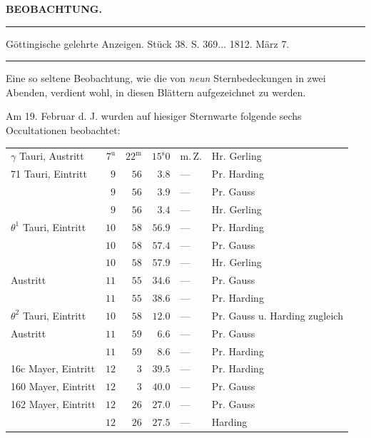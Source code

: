 \clearpage{}\hypertarget{native-353-lower}{}\label{native-353-lower}
\begin{center}\textbf{BEOBACHTUNG.}\par\vspace{4pt}\hrule\vspace{4pt}\fontsize{10}{12}\selectfont Göttingische gelehrte Anzeigen. Stück 38. S. 369\;... 1812. März 7.\par\vspace{4pt}\hrule\vspace{4pt}\end{center}

\par\indent Eine so seltene Beobachtung, wie die von \emph{neun} Sternbedeckungen in zwei Abenden, verdient wohl, in diesen Blättern aufgezeichnet zu werden.

\par\indent Am 19. Februar d. J. wurden auf hiesiger Sternwarte folgende sechs Occultationen beobachtet:

\begin{center}\fontsize{9}{11}\selectfont\setlength{\tabcolsep}{2.5pt}\renewcommand{\arraystretch}{1.15}\begin{tabular}{lrrrll}
$\gamma$ Tauri, Austritt & $7^{\mathrm u}$ & $22^{\mathrm m}$ & $15^{\mathrm s}0$ & m.\,Z. & Hr. Gerling\\
71 Tauri, Eintritt & $9$ & $56$ & $3.8$ & — & Pr. Harding\\
 & $9$ & $56$ & $3.9$ & — & Pr. Gauss\\
 & $9$ & $56$ & $3.4$ & — & Hr. Gerling\\
$\theta^1$ Tauri, Eintritt & $10$ & $58$ & $56.9$ & — & Pr. Harding\\
 & $10$ & $58$ & $57.4$ & — & Pr. Gauss\\
 & $10$ & $58$ & $57.9$ & — & Hr. Gerling\\
Austritt & $11$ & $55$ & $34.6$ & — & Pr. Gauss\\
 & $11$ & $55$ & $38.6$ & — & Pr. Harding\\
$\theta^2$ Tauri, Eintritt & $10$ & $58$ & $12.0$ & — & Pr. Gauss u. Harding zugleich\\
Austritt & $11$ & $59$ & $6.6$ & — & Pr. Gauss\\
 & $11$ & $59$ & $8.6$ & — & Pr. Harding\\
16c Mayer, Eintritt & $12$ & $3$ & $39.5$ & — & Pr. Harding\\
160 Mayer, Eintritt & $12$ & $3$ & $40.0$ & — & Pr. Gauss\\
162 Mayer, Eintritt & $12$ & $26$ & $27.0$ & — & Pr. Gauss\\
 & $12$ & $26$ & $27.5$ & — & Harding\\
\end{tabular}\end{center}

